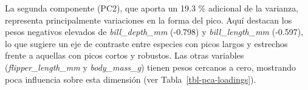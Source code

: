 \documentclass[
  spanish,
  11pt,
  a4paper,
  DIV=11,
  numbers=noendperiod]{scrartcl}
\newenvironment{Shaded}{\begin{snugshade}}{\end{snugshade}}
\newcommand{\AttributeTok}[1]{\textcolor[rgb]{0.40,0.45,0.13}{#1}}
\newcommand{\CommentTok}[1]{\textcolor[rgb]{0.37,0.37,0.37}{#1}}
\newcommand{\DecValTok}[1]{\textcolor[rgb]{0.68,0.00,0.00}{#1}}
\newcommand{\FunctionTok}[1]{\textcolor[rgb]{0.28,0.35,0.67}{#1}}
\newcommand{\NormalTok}[1]{\textcolor[rgb]{0.00,0.23,0.31}{#1}}
\newcommand{\OtherTok}[1]{\textcolor[rgb]{0.00,0.23,0.31}{#1}}
\newcommand{\SpecialCharTok}[1]{\textcolor[rgb]{0.37,0.37,0.37}{#1}}
\begin{document}
La segunda componente (PC2), que aporta un 19.3 \% adicional de la
varianza, representa principalmente variaciones en la forma del pico.
Aquí destacan los pesos negativos elevados de \emph{bill\_depth\_mm}
(-0.798) y \emph{bill\_length\_mm} (-0.597), lo que sugiere un eje de
contraste entre especies con picos largos y estrechos frente a aquellas
con picos cortos y robustos. Las otras variables
(\emph{flipper\_length\_mm} y \emph{body\_mass\_g}) tienen pesos
cercanos a cero, mostrando poca influencia sobre esta dimensión (ver
Tabla~\ref{tbl-pca-loadings}).

\begin{Shaded}
\end{Shaded}
\end{document}
